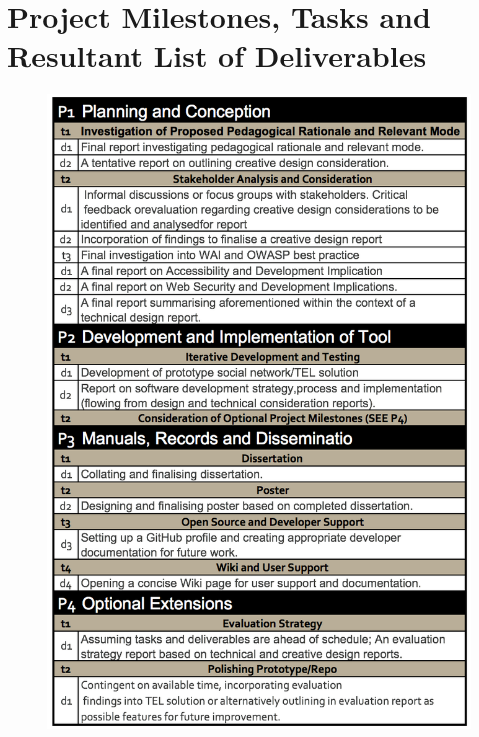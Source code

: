 \section{Project Milestones, Tasks and Resultant List of Deliverables}
\begin{figure}[H]
	\centering
	\includegraphics[scale=.9]{figures/summary}
	\label{fig:List of Deliverables, Milestones and Tasks}
\end{figure}


